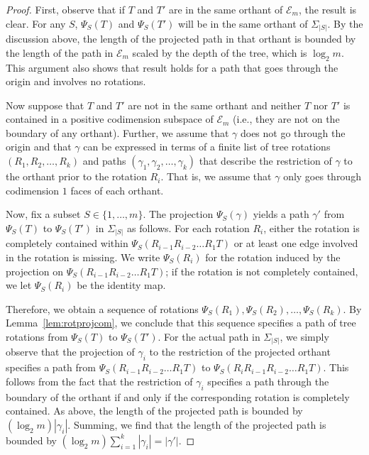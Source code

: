 \documentclass[a4paper,11pt]{article}
\newcommand{\aE}{\mathcal{E}}
\begin{document}
\begin{proof}
First, observe that if $T$ and $T'$ are in the same orthant of $\aE_m$, the result is clear.
For any $S$, $\Psi_S(T)$ and $\Psi_S(T')$ will be in the same orthant of $\Sigma_{|S|}$.
By the discussion above, the length of the projected path in that orthant is bounded by the length of the path in $\aE_m$ scaled by the depth of the tree, which is $\log_2 m$.
This argument also shows that result holds for a path that goes through the origin and involves no rotations.

Now suppose that $T$ and $T'$ are not in the same orthant and neither $T$ nor $T'$ is contained in a positive codimension subspace of $\aE_m$ (i.e., they are not on the boundary of any orthant).
Further, we assume that $\gamma$ does not go through the origin and that $\gamma$ can be expressed in terms of a finite list of tree rotations $(R_1, R_2, \ldots, R_k)$ and paths $(\gamma_1, \gamma_2, \ldots, \gamma_k)$ that describe the restriction of $\gamma$ to the orthant prior to the rotation $R_i$.
That is, we assume that $\gamma$ only goes through codimension $1$ faces of each orthant.

Now, fix a subset $S \in \{1,\ldots,m\}$.
The projection $\Psi_S(\gamma)$ yields a path $\gamma'$ from $\Psi_S(T)$ to $\Psi_S(T')$ in $\Sigma_{|S|}$ as follows.
For each rotation $R_i$, either the rotation is completely contained within $\Psi_S(R_{i-1} R_{i-2} \ldots R_1 T)$ or at least one edge involved in the rotation is missing.
We write $\Psi_S(R_i)$ for the rotation induced by the projection on $\Psi_S(R_{i-1} R_{i-2} \ldots R_1 T)$; if the rotation is not completely contained, we let $\Psi_S(R_i)$ be the identity map.

Therefore, we obtain a sequence of rotations $\Psi_S(R_1), \Psi_S(R_2), \ldots, \Psi_S(R_k)$.
By Lemma~\ref{lem:rotprojcom}, we conclude that this sequence specifies a path of tree rotations from $\Psi_S(T)$ to $\Psi_S(T')$.
For the actual path in $\Sigma_{|S|}$, we simply observe that the projection of $\gamma_i$ to the restriction of the projected orthant specifies a path from $\Psi_S(R_{i-1} R_{i-2} \ldots R_1 T)$ to $\Psi_S(R_i R_{i-1} R_{i-2} \ldots R_1 T)$.
This follows from the fact that the restriction of $\gamma_i$ specifies a path through the boundary of the orthant if and only if the corresponding rotation is completely contained.
As above, the length of the projected path is bounded by $(\log_2 m) |\gamma_i|$.
Summing, we find that the length of the projected path is bounded by $(\log_2 m) \sum_{i=1}^k |\gamma_i| = |\gamma'|$.


\end{proof}
\end{document}
